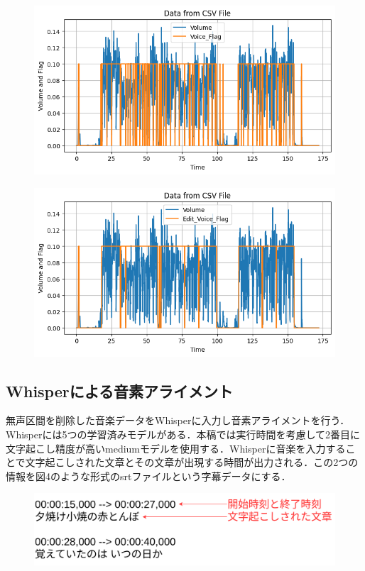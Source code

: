 \begin{multicols*}{2}
\begin{figure} %
\centering
\includegraphics[width=0.95\linewidth]{fig/csv1.png}
\end{figure}

\begin{figure} %
\centering
\includegraphics[width=0.95\linewidth]{fig/csv2.png}
\end{figure}

\subsection{Whisperによる音素アライメント}
無声区間を削除した音楽データをWhisperに入力し音素アライメントを行う．Whisperには5つの学習済みモデルがある．本稿では実行時間を考慮して2番目に文字起こし精度が高いmediumモデルを使用する．Whisperに音楽を入力することで文字起こしされた文章とその文章が出現する時間が出力される．この2つの情報を図4のような形式のsrtファイルという字幕データにする．

\begin{figure} %
	\centering
	\includegraphics[width=\linewidth]{fig/srt.png}
\end{figure}


\end{multicols*}
